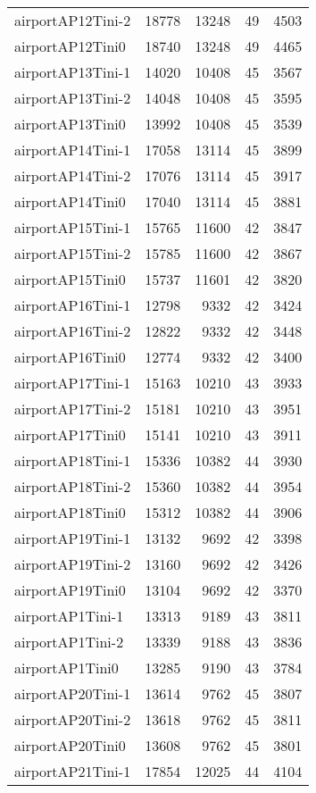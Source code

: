\begin{longtable}{lrrrr}
airportAP12Tini-2 & 18778 & 13248 & 49 & 4503 \\
airportAP12Tini0 & 18740 & 13248 & 49 & 4465 \\
airportAP13Tini-1 & 14020 & 10408 & 45 & 3567 \\
airportAP13Tini-2 & 14048 & 10408 & 45 & 3595 \\
airportAP13Tini0 & 13992 & 10408 & 45 & 3539 \\
airportAP14Tini-1 & 17058 & 13114 & 45 & 3899 \\
airportAP14Tini-2 & 17076 & 13114 & 45 & 3917 \\
airportAP14Tini0 & 17040 & 13114 & 45 & 3881 \\
airportAP15Tini-1 & 15765 & 11600 & 42 & 3847 \\
airportAP15Tini-2 & 15785 & 11600 & 42 & 3867 \\
airportAP15Tini0 & 15737 & 11601 & 42 & 3820 \\
airportAP16Tini-1 & 12798 & 9332 & 42 & 3424 \\
airportAP16Tini-2 & 12822 & 9332 & 42 & 3448 \\
airportAP16Tini0 & 12774 & 9332 & 42 & 3400 \\
airportAP17Tini-1 & 15163 & 10210 & 43 & 3933 \\
airportAP17Tini-2 & 15181 & 10210 & 43 & 3951 \\
airportAP17Tini0 & 15141 & 10210 & 43 & 3911 \\
airportAP18Tini-1 & 15336 & 10382 & 44 & 3930 \\
airportAP18Tini-2 & 15360 & 10382 & 44 & 3954 \\
airportAP18Tini0 & 15312 & 10382 & 44 & 3906 \\
airportAP19Tini-1 & 13132 & 9692 & 42 & 3398 \\
airportAP19Tini-2 & 13160 & 9692 & 42 & 3426 \\
airportAP19Tini0 & 13104 & 9692 & 42 & 3370 \\
airportAP1Tini-1 & 13313 & 9189 & 43 & 3811 \\
airportAP1Tini-2 & 13339 & 9188 & 43 & 3836 \\
airportAP1Tini0 & 13285 & 9190 & 43 & 3784 \\
airportAP20Tini-1 & 13614 & 9762 & 45 & 3807 \\
airportAP20Tini-2 & 13618 & 9762 & 45 & 3811 \\
airportAP20Tini0 & 13608 & 9762 & 45 & 3801 \\
airportAP21Tini-1 & 17854 & 12025 & 44 & 4104 \\

\end{longtable}
